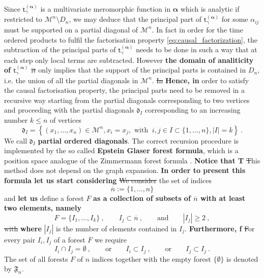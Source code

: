 \documentclass[11pt]{book}
\newcommand{\com}[1]{{\color{red}\bf #1}}
\newcommand{\sbar}[1]{\sout{\color{red} #1}}
\newcommand{\alphabd}{\boldsymbol{\alpha}}
\newcommand{\abs}[1]{\left|#1\right|}
\newcommand{\Mcal}{\mathcal{M}}
\newcommand{\drak}{\mathfrak{d}}
\newcommand{\tsf}{\mathsf{t}}
\theoremstyle{break}
\begin{document}
Since $\tsf^{(\alphabd)}_\gamma$ is a multivariate meromorphic function in $\alphabd$  which is analytic if restricted to $\Mcal^n\setminus D_n$, we may deduce that the principal part of $\tsf^{(\alphabd)}_\gamma$ for some $\alpha_{ij}$ must be supported on a partial diagonal of $\Mcal^n$. In fact in order for the time ordered products to fulfil the factorisation property \eqref{eq:causal_factorization}, the subtraction of the principal parts of $\tsf^{(\alphabd)}_\gamma$ needs to be done in such a way that at each step only local terms are subtracted. However \com{the domain of analiticity of $\tsf^{(\alphabd)}_\gamma$ } \sbar{it} only implies that the support of the principal parts is contained in $D_n$, i.e. the union of all the partial diagonals in $\Mcal^n$. \sbar{In} \com{Hence, in} order to satisfy the causal factorisation property, the principal parts need to be removed in a recursive way starting from the partial diagonals corresponding to two vertices and proceeding with the partial diagonals $\drak_{I}$ corresponding to an increasing number $k \leq n$ of vertices 
%
\begin{equation*}
\drak_{I} = \left\{ (x_1,\dots, x_n) \in \Mcal^n, x_i=x_j, \mbox{ with } \ i,j \in I\subset \{1,\dots, n\} , \abs{I} = k \right\} \ . 
\end{equation*}
%
We call $\drak_{I}$ \textbf{partial ordered diagonals}. The correct recursion procedure is implemented by the so called \textbf{Epstein Glaser forest formula}, which is a position space analogue of the Zimmermann forest formula \cite{duetsch_dimensional_2014}. \com{Notice that T}\sbar{T}his method does not depend on the graph expansion. \com{In order to present this formula let us start considering} \sbar{We consider} the set of indices 
\begin{equation*}
\overline{n} := \{1,\dots , n\} 
\end{equation*}
and \com{let us} define a forest $F$ \com{as a collection of subsets of  $\overline{n}$ with at least two elements, namely }
%
\begin{equation*}
F = \{ I_1,\dots, I_k\} \ , \qquad I_j \subset \overline{n} \ , \qquad \mbox{and} \qquad \abs{I_j} \geq 2 \ ,
\end{equation*}
%
\sbar{with} \com{where} $\abs{I_j}$ is the number of elements contained in $I_j$. \com{Furthermore, f}\sbar{F}or every pair $I_i,I_j$ of a forest $F$ we require
%
\begin{equation*}
I_i\cap I_j = \emptyset \ , \qquad \text{or} \qquad I_i \subset I_j \ , \qquad \mbox{or} \qquad  I_j\subset I_j \ .
\end{equation*}
%
The set of all forests \sbar{$F$} of $n$ indices together with the empty forest $\{\emptyset\}$ is denoted by $\mathfrak{F}_{\overline{n}}$.
\end{document}

